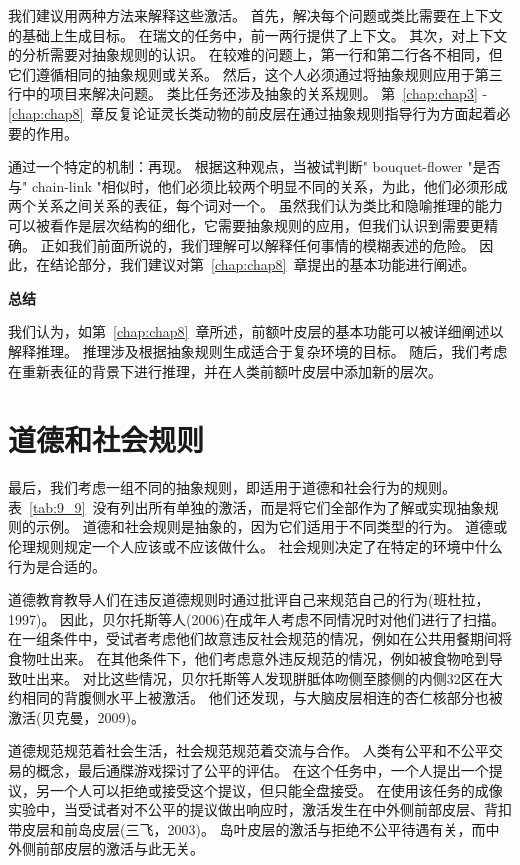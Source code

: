 我们建议用两种方法来解释这些激活。
首先，解决每个问题或类比需要在上下文的基础上生成目标。
在瑞文的任务中，前一两行提供了上下文。
其次，对上下文的分析需要对抽象规则的认识。
在较难的问题上，第一行和第二行各不相同，但它们遵循相同的抽象规则或关系。
然后，这个人必须通过将抽象规则应用于第三行中的项目来解决问题。
类比任务还涉及抽象的关系规则。
第~\ref{chap:chap3} - \ref{chap:chap8}~章反复论证灵长类动物的前皮层在通过抽象规则指导行为方面起着必要的作用。


通过一个特定的机制：再现。
根据这种观点，当被试判断" bouquet-flower "是否与" chain-link "相似时，他们必须比较两个明显不同的关系，为此，他们必须形成两个关系之间关系的表征，每个词对一个。
虽然我们认为类比和隐喻推理的能力可以被看作是层次结构的细化，它需要抽象规则的应用，但我们认识到需要更精确。
正如我们前面所说的，我们理解可以解释任何事情的模糊表述的危险。
因此，在结论部分，我们建议对第~\ref{chap:chap8}~章提出的基本功能进行阐述。



\textbf{总结}

我们认为，如第~\ref{chap:chap8}~章所述，前额叶皮层的基本功能可以被详细阐述以解释推理。
推理涉及根据抽象规则生成适合于复杂环境的目标。
随后，我们考虑在重新表征的背景下进行推理，并在人类前额叶皮层中添加新的层次。



\section{道德和社会规则}

最后，我们考虑一组不同的抽象规则，即适用于道德和社会行为的规则。
表~\ref{tab:9_9}~没有列出所有单独的激活，而是将它们全部作为了解或实现抽象规则的示例。
道德和社会规则是抽象的，因为它们适用于不同类型的行为。
道德或伦理规则规定一个人应该或不应该做什么。
社会规则决定了在特定的环境中什么行为是合适的。


道德教育教导人们在违反道德规则时通过批评自己来规范自己的行为(班杜拉，1997)。
因此，贝尔托斯等人(2006)在成年人考虑不同情况时对他们进行了扫描。
在一组条件中，受试者考虑他们故意违反社会规范的情况，例如在公共用餐期间将食物吐出来。
在其他条件下，他们考虑意外违反规范的情况，例如被食物呛到导致吐出来。
对比这些情况，贝尔托斯等人发现胼胝体吻侧至膝侧的内侧32区在大约相同的背腹侧水平上被激活。
他们还发现，与大脑皮层相连的杏仁核部分也被激活(贝克曼，2009)。


道德规范规范着社会生活，社会规范规范着交流与合作。
人类有公平和不公平交易的概念，最后通牒游戏探讨了公平的评估。
在这个任务中，一个人提出一个提议，另一个人可以拒绝或接受这个提议，但只能全盘接受。
在使用该任务的成像实验中，当受试者对不公平的提议做出响应时，激活发生在中外侧前部皮层、背扣带皮层和前岛皮层(三飞，2003)。
岛叶皮层的激活与拒绝不公平待遇有关，而中外侧前部皮层的激活与此无关。


